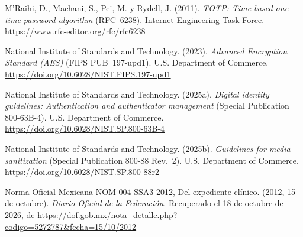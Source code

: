 \documentclass[12pt, a4paper]{article}
\begin{document}
\begin{list}{}{\setlength{\leftmargin}{1.27cm}\setlength{\itemindent}{-1.27cm}%
  \setlength{\labelwidth}{0pt}\setlength{\labelsep}{0pt}\setlength{\itemsep}{6pt}}
\item M'Raihi, D., Machani, S., Pei, M. y Rydell, J. (2011). \textit{TOTP:
  Time-based one-time password algorithm} (RFC~6238). Internet
  Engineering Task Force. \url{https://www.rfc-editor.org/rfc/rfc6238}
 
 
\item National Institute of Standards and Technology. (2023).
  \textit{Advanced Encryption Standard (AES)} (FIPS PUB~197-upd1).
  U.S. Department of Commerce.
  \url{https://doi.org/10.6028/NIST.FIPS.197-upd1}


\item National Institute of Standards and Technology. (2025a).
  \textit{Digital identity guidelines: Authentication and
  authenticator management} (Special Publication 800-63B-4).
  U.S. Department of Commerce.
  \url{https://doi.org/10.6028/NIST.SP.800-63B-4}
 
 
\item National Institute of Standards and Technology. (2025b).
  \textit{Guidelines for media sanitization} (Special Publication
  800-88 Rev.~2). U.S. Department of Commerce.
  \url{https://doi.org/10.6028/NIST.SP.800-88r2}
 

\item Norma Oficial Mexicana NOM-004-SSA3-2012, Del expediente
  clínico. (2012, 15 de octubre). \textit{Diario Oficial de la
  Federación}.
  Recuperado el 18 de octubre de 2026, de \url{https://dof.gob.mx/nota_detalle.php?codigo=5272787&fecha=15/10/2012}



\end{list}
\end{document}
